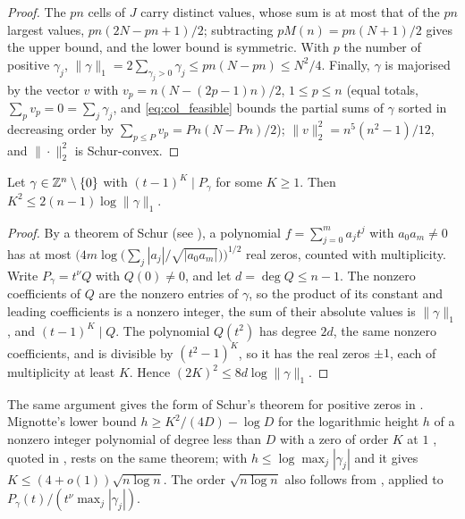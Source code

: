 \begin{proof}
The $pn$ cells of $J$ carry distinct values, whose sum is at most that of the $pn$ largest values, $pn(2N-pn+1)/2$; subtracting $pM(n)=pn(N+1)/2$ gives the upper bound, and the lower bound is symmetric.
With $p$ the number of positive $\gamma_j$, $\|\gamma\|_1=2\sum_{\gamma_j>0}\gamma_j\le pn(N-pn)\le N^2/4$.
Finally, $\gamma$ is majorised by the vector $v$ with $v_p=n(N-(2p-1)n)/2$, $1\le p\le n$ (equal totals, $\sum_pv_p=0=\sum_j\gamma_j$, and \eqref{eq:col_feasible} bounds the partial sums of $\gamma$ sorted in decreasing order by $\sum_{p\le P}v_p=Pn(N-Pn)/2$); $\|v\|_2^2=n^5(n^2-1)/12$, and $\|\cdot\|_2^2$ is Schur-convex.
\end{proof}

\begin{lemma}[Schur's bound at $t=1$]
\label{lem:schur}
Let $\gamma\in\mathbb{Z}^{n}\setminus\{0\}$ with $(t-1)^{K}\mid P_\gamma$ for some $K\ge1$.  Then $K^{2}\le 2(n-1)\log\|\gamma\|_1$.
\end{lemma}

\begin{proof}
By a theorem of Schur \cite{schur1933} (see \cite[(1.4)]{erdosturan1950}), a polynomial $f=\sum_{j=0}^ma_jt^j$ with $a_0a_m\ne0$ has at most $\bigl(4m\log\bigl(\sum_j|a_j|/\sqrt{|a_0a_m|}\bigr)\bigr)^{1/2}$ real zeros, counted with multiplicity.
Write $P_\gamma=t^{\nu}Q$ with $Q(0)\ne0$, and let $d=\deg Q\le n-1$.
The nonzero coefficients of $Q$ are the nonzero entries of $\gamma$, so the product of its constant and leading coefficients is a nonzero integer, the sum of their absolute values is $\|\gamma\|_1$, and $(t-1)^K\mid Q$.
The polynomial $Q(t^2)$ has degree $2d$, the same nonzero coefficients, and is divisible by $(t^2-1)^K$, so it has the real zeros $\pm1$, each of multiplicity at least $K$.
Hence $(2K)^2\le8d\log\|\gamma\|_1$.
\end{proof}

The same argument gives the form of Schur's theorem for positive zeros in \cite[Thm.~A]{BEK1999}.
Mignotte's lower bound $h\ge K^2/(4D)-\log D$ for the logarithmic height $h$ of a nonzero integer polynomial of degree less than $D$ with a zero of order $K$ at $1$ \cite{mignotte1982}, quoted in \cite[Sect.~1]{amoroso1995}, rests on the same theorem; with $h\le\log\max_j|\gamma_j|$ and  it gives $K\le(4+o(1))\sqrt{n\log n}$.
The order $\sqrt{n\log n}$ also follows from \cite[Thms.~2.1 and 2.8]{BEK1999}, applied to $P_\gamma(t)/(t^{\nu}\max_j|\gamma_j|)$.

